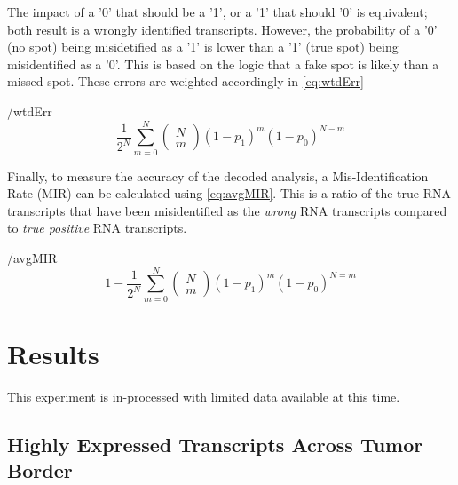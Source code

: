 \documentclass[Endo]{subfiles}
\begin{document}
The impact of a '0' that should be a '1', or a '1' that should '0' is equivalent; both result is a wrongly identified transcripts. However, the probability of a '0' (no spot)  being misidetified as a '1' is lower than a '1' (true spot) being misidentified as a '0'. This is based on the logic that a fake spot is likely than a missed spot. These errors are weighted accordingly in \ref{eq:wtdErr}

\begin{verbatimwrite}{\EqDir/wtdErr}
  \begin{equation}
    \frac{1}{2^N}\sum_{m=0}^N\left(\begin{array}{c}N\\m\end{array}\right)\left(1-p_1\right)^m\left(1-p_0\right)^{N-m}
    \label{eq:wtdErr}
  \end{equation}
\end{verbatimwrite}


Finally, to measure the accuracy of the decoded analysis, a Mis-Identification Rate (MIR) can be calculated using \ref{eq:avgMIR}. This is a ratio of the true RNA transcripts that have been misidentified as the {\it wrong} RNA transcripts compared to {\it true positive} RNA transcripts. 

\begin{verbatimwrite}{\EqDir/avgMIR}
  \begin{equation}
    1-\frac{1}{2^N}\sum_{m=0}^N\left(\begin{array}{l}N\\m\end{array}\right)\left(1-p_1\right)^m\left(1-p_0\right)^{N=m}
    \label{eq:aveMIR}
  \end{equation}
\end{verbatimwrite}


  
\hypertarget{Results}{}
\section{Results}\label{sec:results}

This experiment is in-processed with limited data available at this time. 

\hypertarget{Highly-Expressed-Transcripts-Across-Tumor-Border}{}
\subsection{Highly Expressed Transcripts Across Tumor Border}\label{subsubsec:transcripts}
\end{document}
